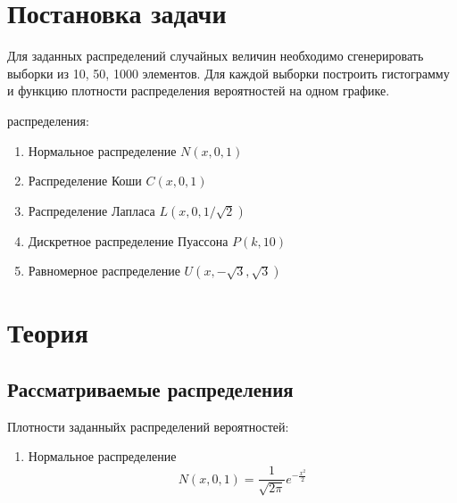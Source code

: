 \documentclass[12pt]{article}
\newcommand{\lskip}{\hfill\break}
\begin{document}
\begin{flushleft}

\setlength{\parindent}{1cm}

\tableofcontents

\newpage

\listoffigures

\newpage

\section{Постановка задачи}

Для заданных распределений случайных величин необходимо сгенерировать выборки из 10, 50, 1000 элементов. Для каждой выборки построить гистограмму и функцию плотности распределения вероятностей на одном графике.
\lskip

 распределения:

\begin{enumerate}
    \item Нормальное распределение $N(x, 0, 1)$
    \item Распределение Коши $C(x, 0, 1)$
    \item Распределение Лапласа $L(x, 0, 1/\sqrt{2})$
    \item Дискретное распределение Пуассона $P(k, 10)$
    \item Равномерное распределение $U(x, -\sqrt{3}, \sqrt{3})$
\end{enumerate}

\newpage

\section{Теория}

    \subsection{Рассматриваемые распределения}

        Плотности заданныйх распределений вероятностей:

        \begin{enumerate}
            \item Нормальное распределение 
            \begin{equation}
                N(x, 0, 1) = \frac{1}{\sqrt{2\pi}}e^{-\frac{x^2}{2}}
                \label{normal}
            \end{equation}


\end{enumerate}
\end{flushleft}
\end{document}
